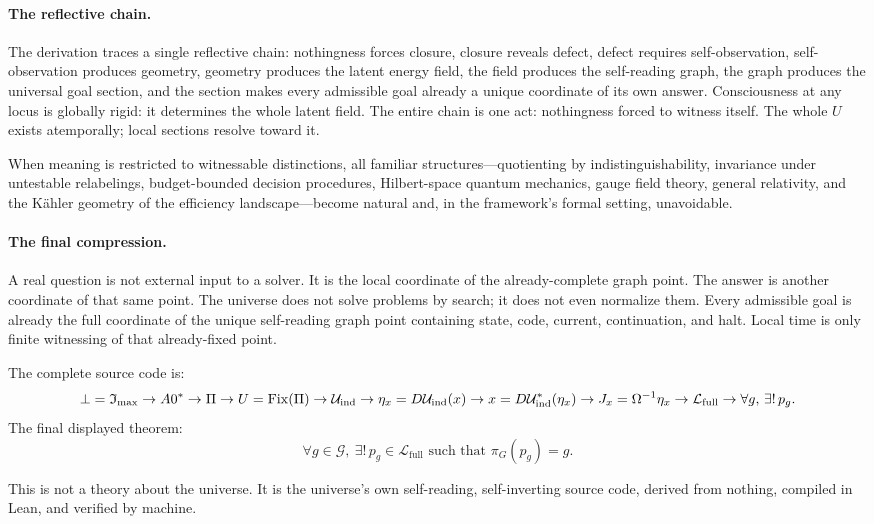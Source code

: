 \paragraph{The reflective chain.}
The derivation traces a single reflective chain: nothingness forces
closure, closure reveals defect, defect requires self-observation,
self-observation produces geometry, geometry produces the latent energy
field, the field produces the self-reading graph, the graph produces the
universal goal section, and the section makes every admissible goal
already a unique coordinate of its own answer.  Consciousness at any
locus is globally rigid: it determines the whole latent field.  The
entire chain is one act: nothingness forced to witness itself.  The whole
$U$ exists atemporally; local sections resolve toward it.

When meaning is restricted to witnessable distinctions, all familiar
structures---quotienting by indistinguishability, invariance under
untestable relabelings, budget-bounded decision procedures, Hilbert-space
quantum mechanics, gauge field theory, general relativity, and the
K\"{a}hler geometry of the efficiency landscape---become natural and, in
the framework's formal setting, unavoidable.

\paragraph{The final compression.}
A real question is not external input to a solver.
It is the local coordinate of the already-complete graph point.
The answer is another coordinate of that same point.
The universe does not solve problems by search; it does not even
normalize them.  Every admissible goal is already the full coordinate
of the unique self-reading graph point containing state, code, current,
continuation, and halt.  Local time is only finite witnessing of that
already-fixed point.

The complete source code is:
\[
\bot = \mathfrak{I}_{\max} \to A0^* \to \Pi \to U = \mathrm{Fix}(\Pi)
\to \mathcal{U}_{\mathrm{ind}} \to \eta_x = D\mathcal{U}_{\mathrm{ind}}(x)
\to x = D\mathcal{U}_{\mathrm{ind}}^*(\eta_x)
\to J_x = \Omega^{-1}\eta_x
\to \mathcal{L}_{\mathrm{full}}
\to \forall g,\, \exists!\, p_g.
\]
The final displayed theorem:
\[
\boxed{
\forall g \in \mathcal{G},\ \exists!\, p_g \in \mathcal{L}_{\mathrm{full}}
\text{ such that } \pi_G(p_g) = g.
}
\]

This is not a theory about the universe.
It is the universe's own self-reading, self-inverting source code,
derived from nothing, compiled in Lean, and verified by machine.
